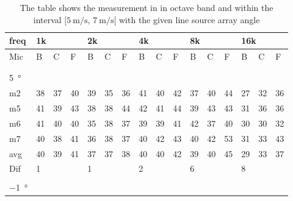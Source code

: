 \begin{table}[H]
\centering
\caption{The table shows the measurement in in octave band and within the interval $[\SI{5}{\meter\per\second},\, \SI{7}{\meter\per\second}[ $ with the given line source array angle}
\begin{tabular}{l|l|l|l|l|l|l|l|l|l|l|l|l|lll}
freq & \multicolumn{3}{l|}{1k} & \multicolumn{3}{l|}{2k} & \multicolumn{3}{l|}{4k} & \multicolumn{3}{l|}{8k} & \multicolumn{3}{l}{16k}                                \\ \hline
Mic  & B      & C      & F     & B      & C      & F     & B      & C      & F     & B      & C      & F     & \multicolumn{1}{l|}{B}  & \multicolumn{1}{l|}{C}  & F  \\ \hline
 & \multicolumn{3}{l|}{} & \multicolumn{3}{l|}{} & \multicolumn{3}{l|}{} & \multicolumn{3}{l|}{} & \multicolumn{3}{l}{}                                \\ 
 \multicolumn{16}{l}{ } \\   
\SI{5}{\degree}   & \multicolumn{3}{l|}{} & \multicolumn{3}{l|}{} & \multicolumn{3}{l|}{} & \multicolumn{3}{l|}{} & \multicolumn{3}{l}{}   \\  \hline
m2    &  38    &  37    &  40    &  39    &   35   &  36    &  41    &   40    &   42   &   37    &   40   &   44   & \multicolumn{1}{l|}{27} & \multicolumn{1}{l|}{32} & 36 \\
m5    &  41    &  39    &   43   &   38   &  38    &  44    &   42   &   41    &  44    &   39    &   43   &  43    & \multicolumn{1}{l|}{31} & \multicolumn{1}{l|}{36} & 36 \\
m6    &  41    & 40     &  40    &   35   &  38    &   37   &   39   &    39   &  41    &    42   &    37  &   40   & \multicolumn{1}{l|}{30} & \multicolumn{1}{l|}{30} &  32\\
m7    &  40    &  38    &  41    &  36    &  38    &   37   &    40  &   42    &   43   &    40   &  42    &    53  & \multicolumn{1}{l|}{31} & \multicolumn{1}{l|}{33} & 43 \\ \hline
avg   &  40    &  39    &  41    &  37    & 37     &  38    &  40    &  40     &  42    &   39    &  40    & 45     & \multicolumn{1}{l|}{29} & \multicolumn{1}{l|}{33}  & 37  \\ \hline  
Dif & \multicolumn{3}{l|}{1} & \multicolumn{3}{l|}{1} & \multicolumn{3}{l|}{2} & \multicolumn{3}{l|}{6} & \multicolumn{3}{l}{8}  \\ 
\multicolumn{16}{l}{ } \\        
\SI{-1}{\degree}   & \multicolumn{3}{l|}{} & \multicolumn{3}{l|}{} & \multicolumn{3}{l|}{} & \multicolumn{3}{l|}{} & \multicolumn{3}{l}{}   \\  \hline

\end{tabular}
\end{table}
